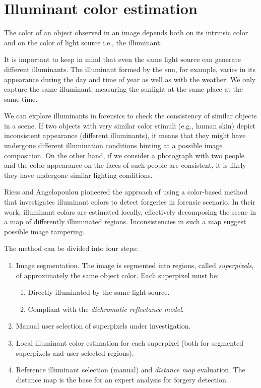 \section{Illuminant color estimation}


The color of an object observed in an image depends both on its intrinsic color and on the color of light source i.e., the illuminant. 

It is important to keep in mind that even the same light source can generate different illuminants. The illuminant formed by the sun, for example, varies in its appearance during the day and time of year as well as with the weather. We only capture the same illuminant, measuring the sunlight at the same place at the same time.

We can explore illuminants in forensics to check the consistency of similar objects in a scene. If two objects with very similar color stimuli (e.g., human skin) depict inconsistent appearance (different illuminants), it means  that they might have undergone different illumination conditions hinting at a possible image composition. On the other hand, if we consider a photograph with two people and the color appearance on the faces of such people are consistent, it is likely they have undergone similar lighting conditions.

Riess and Angelopoulou\cite{riess2010scene} pioneered the approach of using a color-based method that investigates illuminant colors to detect forgeries in forensic scenario. In their work, illuminant colors are estimated locally, effectively decomposing the scene in a map of differently illuminated regions. Inconsistencies in such a map suggest possible image tampering.

The method can be divided into four steps:

\begin{enumerate}
\item Image segmentation. The image is segmented into regions, called \emph{superpixels}, of approximately the same object color. Each superpixel must be:
\begin{enumerate}
\item Directly illuminated by the same light source.
\item Compliant with the \emph{dichromatic reflectance model}\cite{tan2004color}.
\end{enumerate}
\item Manual user selection of superpixels under investigation.
\item Local illuminant color estimation for each superpixel (both for segmented superpixels and user selected regions).
\item Reference illuminant selection (manual) and \emph{distance map} evaluation. The distance map is the base for an expert analysis for forgery detection.
\end{enumerate}

